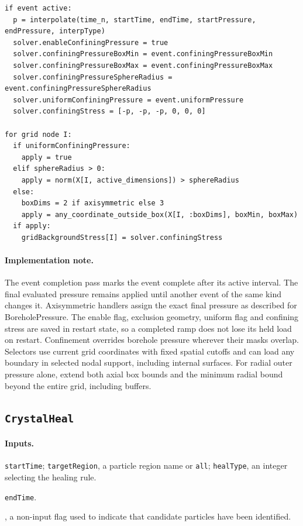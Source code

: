 \begin{lstlisting}[caption={ConfiningPressure event pseudocode.}]
if event active:
  p = interpolate(time_n, startTime, endTime, startPressure, endPressure, interpType)
  solver.enableConfiningPressure = true
  solver.confiningPressureBoxMin = event.confiningPressureBoxMin
  solver.confiningPressureBoxMax = event.confiningPressureBoxMax
  solver.confiningPressureSphereRadius = event.confiningPressureSphereRadius
  solver.uniformConfiningPressure = event.uniformPressure
  solver.confiningStress = [-p, -p, -p, 0, 0, 0]

for grid node I:
  if uniformConfiningPressure:
    apply = true
  elif sphereRadius > 0:
    apply = norm(X[I, active_dimensions]) > sphereRadius
  else:
    boxDims = 2 if axisymmetric else 3
    apply = any_coordinate_outside_box(X[I, :boxDims], boxMin, boxMax)
  if apply:
    gridBackgroundStress[I] = solver.confiningStress
\end{lstlisting}

\paragraph{Implementation note.}
The event completion pass marks the event complete after its active interval. The final evaluated pressure remains applied until another event of the same kind changes it. Axisymmetric handlers assign the exact final pressure as described for BoreholePressure. The enable flag, exclusion geometry, uniform flag and confining stress are saved in restart state, so a completed ramp does not lose its held load on restart. Confinement overrides borehole pressure wherever their masks overlap. Selectors use current grid coordinates with fixed spatial cutoffs and can load any boundary in selected nodal support, including internal surfaces. For radial outer pressure alone, extend both axial box bounds and the minimum radial bound beyond the entire grid, including buffers.

\subsection{\texttt{CrystalHeal}}
\label{subsec:event-crystal-heal}

\paragraph{Inputs.}
\begin{description}[leftmargin=*,style=nextline]
\item[\textbf{Required.}] \texttt{startTime}; \texttt{targetRegion}, a particle region name or \texttt{all}; \texttt{healType}, an integer selecting the healing rule.
\item[\textbf{Optional.}] \texttt{endTime}.
\item[\textbf{Internal state.}] , a non-input flag used to indicate that candidate particles have been identified.
\end{description}

